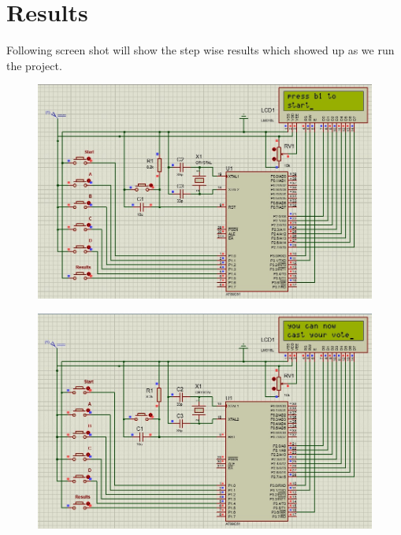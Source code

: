 \section{Results}
Following screen shot will show the step wise results which showed up as we run the project.
\begin{figure}[H]  %
\begin{center}
\includegraphics[scale=0.50]{Chapter4/simulation3}
\end{center}
\end{figure}
\begin{figure}[H]  %
\begin{center}
\includegraphics[scale=0.50]{Chapter4/simulation4}
\end{center}
\end{figure}
